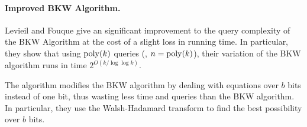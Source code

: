 %
%

\paragraph{Improved BKW Algorithm.} Levieil and Fouque \cite{Levieil06} give an significant improvement to the query complexity of the BKW Algorithm at the cost of a slight loss in running time.
In particular, they show that using $\operatorname{poly}(k)$ queries (\ie, $n = \operatorname{poly}(k)$), their variation of the BKW algorithm runs in time $2^{O(k/\log\log k)}$.

The algorithm modifies the BKW algorithm by dealing with equations over $b$ bits instead of one bit, thus wasting less time and queries than the BKW algorithm.
In particular, they use the Walsh-Hadamard transform to find the best possibility over $b$ bits.

